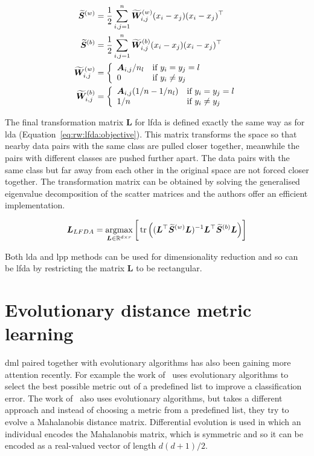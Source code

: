 \documentclass[12pt,a4paper]{report}
\begin{document}
\begin{align}
\widetilde{\bm{S}}^{(w)} &= \frac{1}{2} \sum_{i,j=1}^n \widetilde{\bm{W}}_{i,j}^{(w)} (x_i-x_j)(x_i-x_j)^\top \label{eq:rw:lfda:within}
\\
\widetilde{\bm{S}}^{(b)} &= \frac{1}{2} \sum_{i,j=1}^n \widetilde{\bm{W}}_{i,j}^{(b)} (x_i-x_j)(x_i-x_j)^\top \label{eq:rw:lfda:between}
\\
\widetilde{\bm{W}}_{i,j}^{(w)} &= \left\{ \begin{array}{ll} \bm{A}_{i,j}/n_l & \mbox{if } y_i=y_j=l \\ 0 & \mbox{if } y_i \neq y_j \end{array} \right. \label{eq:rw:lfda:wwithin}
\\
\widetilde{\bm{W}}_{i,j}^{(b)} &= \left\{ \begin{array}{ll} \bm{A}_{i,j}(1/n-1/n_l) & \mbox{if } y_i=y_j=l \\ 1/n & \mbox{if } y_i \neq y_j \end{array} \right. \label{eq:rw:lfda:wbetween}
\end{align}

The final transformation matrix $\bm{L}$ for \ac{lfda} is defined exactly the same way as for \ac{lda} (Equation~\ref{eq:rw:lfda:objective}). This matrix transforms the space so that nearby data pairs with the same class are pulled closer together, meanwhile the pairs with different classes are pushed further apart. The data pairs with the same class but far away from each other in the original space are not forced closer together. The transformation matrix can be obtained by solving the generalised eigenvalue decomposition of the scatter matrices and the authors offer an efficient implementation.

\begin{equation}
\bm{L}_{LFDA} = \operatorname*{argmax}_{\bm{L} \in \mathbb{R}^{d \times r}} \bigg[\operatorname*{tr}\Big( ( \bm{L}^\top\widetilde{\bm{S}}^{(w)}\bm{L} )^{-1} \bm{L}^\top\widetilde{\bm{S}}^{(b)}\bm{L} \Big)\bigg] \label{eq:rw:lfda:objective}
\end{equation}

Both \ac{lda} and \ac{lpp} methods can be used for dimensionality reduction and so can be \ac{lfda} by restricting the matrix $\bm{L}$ to be rectangular.

\section{Evolutionary distance metric learning} \label{chap:rw:fukui}


\Ac{dml} paired together with evolutionary algorithms has also been gaining more attention recently. For example the work of~\citep{koloseni2012optimized} uses evolutionary algorithms to select the best possible metric out of a predefined list to improve a classification error. The work of~\citep{fukui2013evolutionary} also uses evolutionary algorithms, but takes a different approach and instead of choosing a metric from a predefined list, they try to evolve a Mahalanobis distance matrix. Differential evolution is used in which an individual encodes the Mahalanobis matrix, which is symmetric and so it can be encoded as a real-valued vector of length $d(d+1)/2$.
\end{document}
